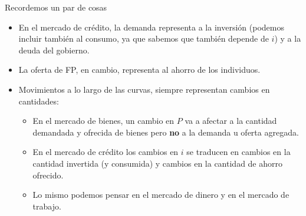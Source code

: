 \documentclass{beamer}
\begin{document}
\begin{frame}{Recordemos un par de cosas}
\begin{itemize}
    \item En el mercado de crédito, la demanda representa a la inversión (podemos incluir también al consumo, ya que sabemos que también depende de $i$) y a la deuda del gobierno.
    \item La oferta de FP, en cambio, representa al ahorro de los individuos.
    \item Movimientos a lo largo de las curvas, siempre representan cambios en cantidades:
    \begin{itemize}
        \item En el mercado de bienes, un cambio en $P$ va a afectar a la cantidad demandada y ofrecida de bienes pero \textbf{no} a la demanda u oferta agregada. 
        \item En el mercado de crédito los cambios en $i$ se traducen en cambios en la cantidad invertida (y consumida) y cambios en la cantidad de ahorro ofrecido.
        \item Lo mismo podemos pensar en el mercado de dinero y en el mercado de trabajo.
    \end{itemize}
\end{itemize}
\end{frame}
\end{document}
